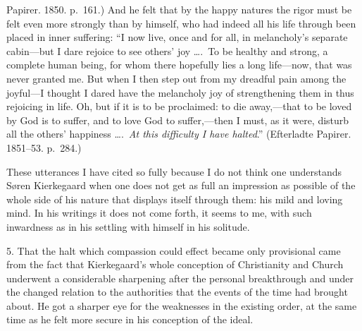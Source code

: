 \documentclass[12pt,a4paper]{book}
\newcommand{\opage}[1]{\marginnote{\footnotesize\textit{[#1]}}}
\begin{document}
Papirer. 1850. p.~161.) And he felt that by the happy natures the rigor
must be felt even more strongly than by himself, who had indeed all his
life through been placed in inner suffering: ``I now live, once and for
all, in melancholy's separate cabin---but I dare rejoice to see others'
joy \dots.\ To be
\opage{138}healthy and strong, a complete human being, for whom there
hopefully lies a long life---now, that was never granted me. But when I
then step out from my dreadful pain among the joyful---I thought I dared
have the melancholy joy of strengthening them in thus rejoicing in life.
Oh, but if it is to be proclaimed: to die away,---that to be loved by
God is to suffer, and to love God to suffer,---then I must, as it were,
disturb all the others' happiness \dots.\ \textit{At this difficulty I
have halted}.'' (Efterladte Papirer. 1851--53. p.~284.)

These utterances I have cited so fully because I do not think one
understands Søren Kierkegaard when one does not get as full an
impression as possible of the whole side of his nature that displays
itself through them: his mild and loving mind. In his writings it does
not come forth, it seems to me, with such inwardness as in his settling
with himself in his solitude.

5. That the halt which compassion could effect became only provisional
came from the fact that Kierkegaard's whole conception of Christianity
and Church underwent a considerable sharpening after the personal
breakthrough and under the changed relation to the authorities that the
events of the time had brought about. He got a sharper eye for the
weaknesses in the existing order, at the same time as he felt more
secure in his conception of the ideal.
\end{document}
